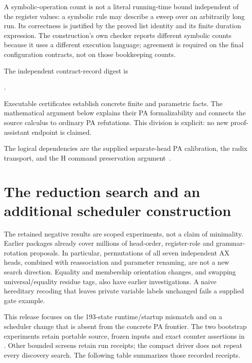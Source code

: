 \documentclass[11pt]{article}
\theoremstyle{definition}\newtheorem{definition}[theorem]{Definition}
\newcommand{\file}[1]{\path{#1}}
\begin{document}
A symbolic-operation count is not a literal running-time bound independent
of the register values: a symbolic rule may describe a sweep over an
arbitrarily long run. Its correctness is justified by the proved list
identity and its finite duration expression. The construction's own
checker reports different symbolic counts because it uses a different
execution language; agreement is required on the final configuration
contracts, not on those bookkeeping counts.

The independent contract-record digest is
\begin{center}\small
{}.
\end{center}
Executable certificates establish concrete finite and parametric facts.
The mathematical argument below explains their PA formalizability and
connects the source calculus to ordinary PA refutations. This division is
explicit: no new proof-assistant endpoint is claimed.

The logical dependencies are the supplied separate-head PA calibration,
the radix transport, and the H command preservation argument~\cite{primary,radix,h6}.


\section{The reduction search and an additional scheduler construction}
\label{sec:search}

The retained negative results are scoped experiments, not a claim of
minimality. Earlier packages already cover millions of head-order,
register-role and grammar-rotation proposals. In particular, permutations
of all seven independent AX heads, combined with reassociation and
parameter renaming, are not a new search direction. Equality and membership
orientation changes, and swapping universal/equality residue tags, also
have earlier investigations. A naive hereditary recoding that leaves
private variable labels unchanged fails a supplied gate example.

This release focuses on the 193-state runtime/startup mismatch and on a
scheduler change that is absent from the concrete PA frontier. The two
bootstrap experiments retain portable source, frozen inputs and exact
counter assertions in \file{research/reduction/}. Other bounded screens
retain run receipts; the compact driver does not repeat every discovery
search. The following table summarizes those recorded receipts.

\end{document}
